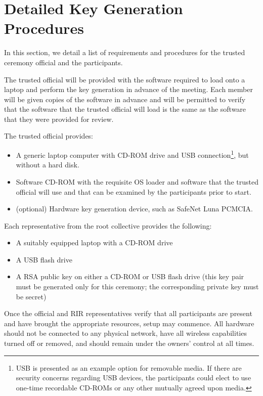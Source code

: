 \section{Detailed Key Generation Procedures}
\label{sec:keygen-detail}

In this section, we detail a list of requirements and procedures for
the trusted ceremony official and the participants.

The trusted official will be provided with the software required to
load onto a laptop and perform the key generation in advance of the
meeting. Each member will be given copies of the software in advance
and will be permitted to verify that the software that the trusted
official will load is the same as the software that they were provided
for review.


The trusted official provides:
\begin{itemize}
\item A generic laptop computer with CD-ROM drive and USB
connection\footnote{USB is presented as an example option for
removable media. If there are security concerns regarding USB devices,
the participants could elect to use one-time recordable CD-ROMs or any
other mutually agreed upon media.}, but without a hard disk.

\item Software CD-ROM with the requisite OS loader and software that the
trusted official will use and that can be examined by the participants
prior to start.
\item (optional) Hardware key generation device, such as SafeNet Luna PCMCIA.
\end{itemize}

{\noindent Each representative from the root collective provides the following:}
\begin{itemize}
\item A suitably equipped laptop with a CD-ROM drive
\item A USB flash drive
\item A RSA public key on either a CD-ROM or USB flash drive (this key
pair must be generated only for this ceremony; the corresponding
private key must be secret)
\end{itemize}

Once the official and RIR representatives verify that all participants
are present and have brought the appropriate resources, setup may
commence. All hardware should not be connected to any physical
network, have all wireless capabilities turned off or removed, and
should remain under the owners' control at all times.

